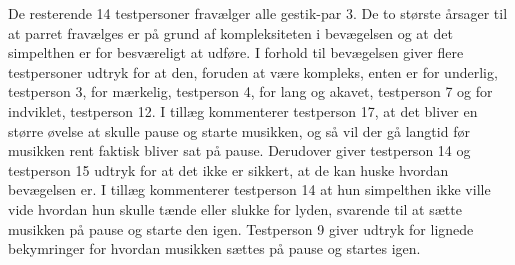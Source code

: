De resterende 14 testpersoner fravælger alle gestik-par 3. De to største årsager til at parret fravælges er på grund af kompleksiteten i bevægelsen og at det simpelthen er for besværeligt at udføre. I forhold til bevægelsen giver flere testpersoner udtryk for at den, foruden at være kompleks, enten er for underlig, testperson 3, for mærkelig, testperson 4, for lang og akavet, testperson 7 og for indviklet, testperson 12. I tillæg kommenterer testperson 17, at det bliver en større øvelse at skulle pause og starte musikken, og så vil der gå langtid før musikken rent faktisk bliver sat på pause. Derudover giver testperson 14 og testperson 15 udtryk for at det ikke er sikkert, at de kan huske hvordan bevægelsen er. I tillæg kommenterer testperson 14 at hun simpelthen ikke ville vide hvordan hun skulle tænde eller slukke for lyden, svarende til at sætte musikken på pause og starte den igen. Testperson 9 giver udtryk for lignede bekymringer for hvordan musikken sættes på pause og startes igen.

